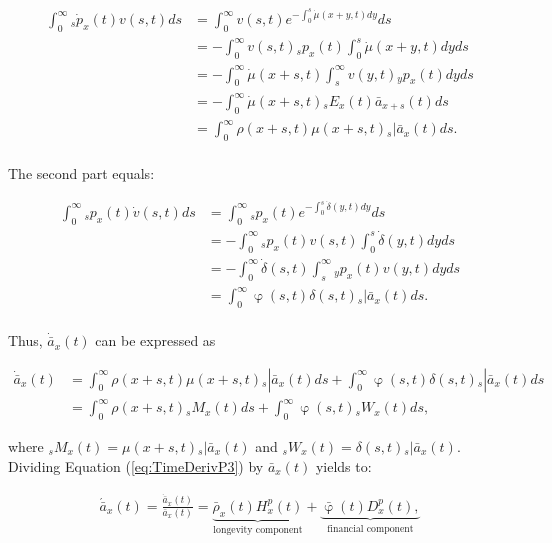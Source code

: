 \documentclass[12pt]{article}
\begin{document}
{\begin{equation}\label{eq:TimeDerivP1}
\begin{split}
\int_0^\infty {}_s\dot{p}_x(t) v(s,t)ds &= \int_0^\infty   v(s,t) e^{-\int_0^{s}\dot{\mu}(x+y,t)dy}ds\\
&= -\int_0^\infty   v(s,t) {}_sp_x(t)\int_0^{s}\dot{\mu}(x+y,t)dyds\\
&= -\int_0^\infty  \dot{\mu}(x+s,t) \int_s^{\infty} v(y,t) {}_yp_x(t) dyds\\
&= - \int_0^\infty \dot{\mu}(x+s,t)   {}_sE_x(t) \bar{a} _{x+s}(t) ds\\
&= \int_0^\infty \rho(x+s,t) \mu(x+s,t)   {}_s|\bar{a}_x(t) ds.\\
\end{split}
\end{equation}


The second part equals:

\begin{equation}\label{eq:TimeDerivP2}
\begin{split}
\int_0^\infty {}_sp_x(t) \dot{v}(s,t)ds &= \int_0^\infty {}_sp_x(t)  e^{-\int_0^{s}\dot{\delta}(y,t)dy}ds\\
&= -\int_0^\infty {}_sp_x(t) v(s,t) \int_0^{s}\dot{\delta}(y,t)dy ds\\
&= -\int_0^\infty  \dot{\delta}(s,t)\int_s^{\infty} {}_yp_x(t) v(y,t) dy ds\\
&= \int_0^\infty  \upvarphi(s,t) \delta(s,t)  {}_s|\bar{a}_x(t) ds.\\
\end{split}
\end{equation}


Thus, $\dot{\bar{a}} _x(t)$ can be expressed as


\begin{equation}\label{eq:TimeDerivP3}
\begin{split}
\dot{\bar{a}}_{x}(t) &=  \int_0^\infty \rho(x+s,t) \mu(x+s,t){}_s|\bar{a}_x(t) ds +\int_0^\infty  \upvarphi(s,t) \delta(s,t)  {}_s|\bar{a}_x(t) ds\\
&= \int_0^\infty \rho(x+s,t) {}_sM_x(t)  ds +\int_0^\infty  \upvarphi(s,t) {}_sW_x(t)  ds,
\end{split}
\end{equation}


where ${}_sM_x(t)= \mu(x+s,t){}_s|\bar{a}_x(t)$ and ${}_sW_x(t)=\delta(s,t)  {}_s|\bar{a}_x(t)$. Dividing Equation (\ref{eq:TimeDerivP3}) by $\bar{a}_x(t)$ yields to:


\begin{equation}\label{eq:TimeDerivP}
\begin{split}
 \acute{\bar{a}}_x(t) = \frac{\dot{\bar{a}}_x(t)}{\bar{a}_x(t)}  = 
 \underbrace{\bar{\rho}_x(t){H}^{p}_x(t)}_\text{longevity component}
 +\underbrace{\bar{\upvarphi}(t){D}^{p}_x(t),}_\text{financial component}
\end{split}
\end{equation}

}
\end{document}
